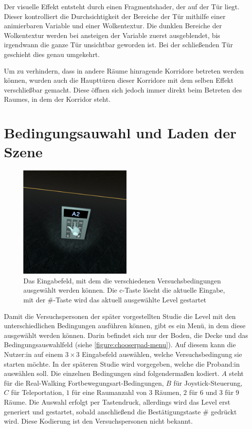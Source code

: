 Der visuelle Effekt entsteht durch einen Fragmentshader, der auf der Tür liegt. Dieser kontrolliert die Durchsichtigkeit der Bereiche der Tür mithilfe einer animierbaren Variable und einer Wolkentextur. Die dunklen Bereiche der Wolkentextur werden bei ansteigen der Variable zuerst ausgeblendet, bis irgendwann die ganze Tür unsichtbar geworden ist. Bei der schließenden Tür geschieht dies genau umgekehrt.

Um zu verhindern, dass in andere Räume hinragende Korridore betreten werden können, wurden auch die Haupttüren dieser Korridore mit dem selben Effekt verschließbar gemacht. Diese öffnen sich jedoch immer direkt beim Betreten des Raumes, in dem der Korridor steht.

\section{Bedingungsauwahl und Laden der Szene} \label{sec:chooserpad}
\begin{figure}[!h]
    \centering
    \includegraphics[width=0.5\textwidth]{vrscreenshots/better_chooserpad.jpg}
    \caption{Das Eingabefeld, mit dem die verschiedenen Versuchsbedingungen ausgewählt werden können. Die c-Taste löscht die aktuelle Eingabe, mit der \#-Taste wird das aktuell ausgewählte Level gestartet}\label{figure:chooserpad-menu}
\end{figure}
Damit die Versuchspersonen der später vorgestellten Studie die Level mit den unterschiedlichen Bedingungen ausführen können, gibt es ein Menü, in dem diese ausgewählt werden können. Darin befindet sich nur der Boden, die Decke und das Bedingungsauswahlfeld (siehe \autoref{figure:chooserpad-menu}). Auf diesem kann die Nutzer:in auf einem $3 \times 3$ Eingabefeld auswählen, welche Versuchsbedingung sie starten möchte. In der späteren Studie wird vorgegeben, welche die Proband:in auswählen soll. Die einzelnen Bedingungen sind folgendermaßen kodiert. $A$ steht für die Real-Walking Fortbewegungsart-Bedingungen, $B$ für Joystick-Steuerung, $C$ für Teleportation, $1$ für eine Raumanzahl von 3 Räumen, $2$ für 6 und $3$ für 9 Räume. Die Auswahl erfolgt per Tastendruck, allerdings wird das Level erst generiert und gestartet, sobald anschließend die Bestätigungstaste \# gedrückt wird. Diese Kodierung ist den Versuchspersonen nicht bekannt.

